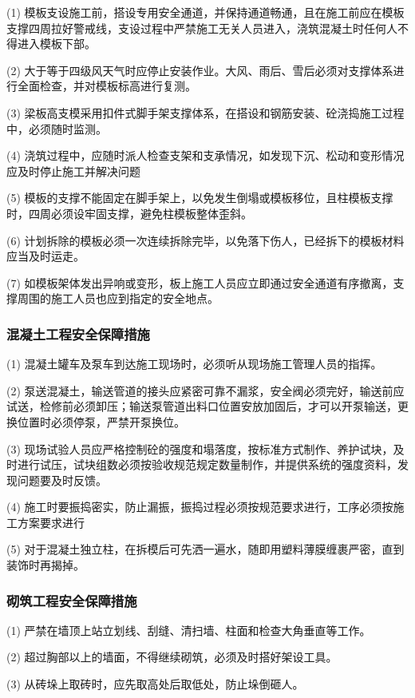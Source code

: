 (1) 模板支设施工前，搭设专用安全通道，并保持通道畅通，且在施工前应在模板支撑四周拉好警戒线，支设过程中严禁施工无关人员进入，浇筑混凝土时任何人不得进入模板下部。

(2) 大于等于四级风天气时应停止安装作业。大风、雨后、雪后必须对支撑体系进行全面检查，并对模板标高进行复测。

(3) 梁板高支模采用扣件式脚手架支撑体系，在搭设和钢筋安装、砼浇捣施工过程中，必须随时监测。

(4) 浇筑过程中，应随时派人检查支架和支承情况，如发现下沉、松动和变形情况应及时停止施工并解决问题

(5) 模板的支撑不能固定在脚手架上，以免发生倒塌或模板移位，且柱模板支撑时，四周必须设牢固支撑，避免柱模板整体歪斜。

(6) 计划拆除的模板必须一次连续拆除完毕，以免落下伤人，已经拆下的模板材料应当及时运走。

(7) 如模板架体发出异响或变形，板上施工人员应立即通过安全通道有序撤离，支撑周围的施工人员也应到指定的安全地点。

\subsubsection{混凝土工程安全保障措施}

(1) 混凝土罐车及泵车到达施工现场时，必须听从现场施工管理人员的指挥。

(2) 泵送混凝土，输送管道的接头应紧密可靠不漏浆，安全阀必须完好，输送前应试送，检修前必须卸压；输送泵管道出料口位置安放加固后，才可以开泵输送，更换位置时必须停泵，严禁开泵换位。

(3) 现场试验人员应严格控制砼的强度和塌落度，按标准方式制作、养护试块，及时进行试压，试块组数必须按验收规范规定数量制作，并提供系统的强度资料，发现问题要及时反馈。

(4) 施工时要振捣密实，防止漏振，振捣过程必须按规范要求进行，工序必须按施工方案要求进行

(5) 对于混凝土独立柱，在拆模后可先洒一遍水，随即用塑料薄膜缠裹严密，直到装饰时再揭掉。

\subsubsection{砌筑工程安全保障措施}

(1) 严禁在墙顶上站立划线、刮缝、清扫墙、柱面和检查大角垂直等工作。

(2) 超过胸部以上的墙面，不得继续砌筑，必须及时搭好架设工具。

(3) 从砖垛上取砖时，应先取高处后取低处，防止垛倒砸人。

